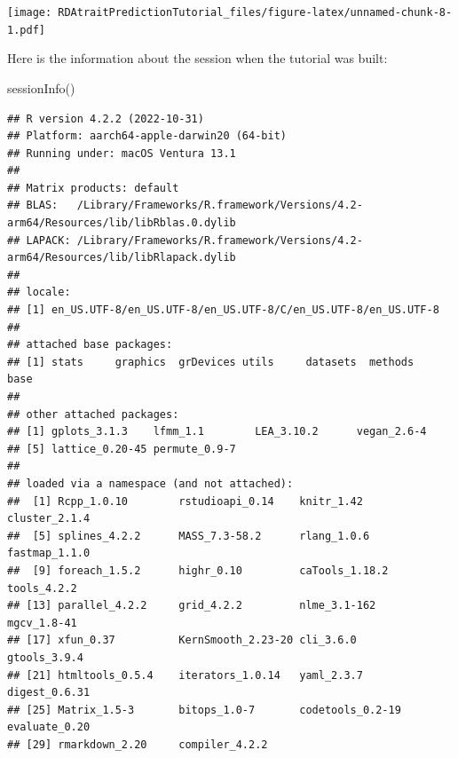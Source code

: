 \documentclass[
]{article}
\newenvironment{Shaded}{\begin{snugshade}}{\end{snugshade}}
\newcommand{\AttributeTok}[1]{\textcolor[rgb]{0.77,0.63,0.00}{#1}}
\newcommand{\ConstantTok}[1]{\textcolor[rgb]{0.00,0.00,0.00}{#1}}
\newcommand{\DecValTok}[1]{\textcolor[rgb]{0.00,0.00,0.81}{#1}}
\newcommand{\FunctionTok}[1]{\textcolor[rgb]{0.00,0.00,0.00}{#1}}
\newcommand{\NormalTok}[1]{#1}
\newcommand{\SpecialCharTok}[1]{\textcolor[rgb]{0.00,0.00,0.00}{#1}}
\newcommand{\StringTok}[1]{\textcolor[rgb]{0.31,0.60,0.02}{#1}}
\begin{document}
\begin{Shaded}
\end{Shaded}

\texttt{[image: RDAtraitPredictionTutorial\_files/figure-latex/unnamed-chunk-8-1.pdf]}

Here is the information about the session when the tutorial was built:

\begin{Shaded}
\begin{Highlighting}[]
\FunctionTok{sessionInfo}\NormalTok{()}
\end{Highlighting}
\end{Shaded}

\begin{verbatim}
## R version 4.2.2 (2022-10-31)
## Platform: aarch64-apple-darwin20 (64-bit)
## Running under: macOS Ventura 13.1
## 
## Matrix products: default
## BLAS:   /Library/Frameworks/R.framework/Versions/4.2-arm64/Resources/lib/libRblas.0.dylib
## LAPACK: /Library/Frameworks/R.framework/Versions/4.2-arm64/Resources/lib/libRlapack.dylib
## 
## locale:
## [1] en_US.UTF-8/en_US.UTF-8/en_US.UTF-8/C/en_US.UTF-8/en_US.UTF-8
## 
## attached base packages:
## [1] stats     graphics  grDevices utils     datasets  methods   base     
## 
## other attached packages:
## [1] gplots_3.1.3    lfmm_1.1        LEA_3.10.2      vegan_2.6-4    
## [5] lattice_0.20-45 permute_0.9-7  
## 
## loaded via a namespace (and not attached):
##  [1] Rcpp_1.0.10        rstudioapi_0.14    knitr_1.42         cluster_2.1.4     
##  [5] splines_4.2.2      MASS_7.3-58.2      rlang_1.0.6        fastmap_1.1.0     
##  [9] foreach_1.5.2      highr_0.10         caTools_1.18.2     tools_4.2.2       
## [13] parallel_4.2.2     grid_4.2.2         nlme_3.1-162       mgcv_1.8-41       
## [17] xfun_0.37          KernSmooth_2.23-20 cli_3.6.0          gtools_3.9.4      
## [21] htmltools_0.5.4    iterators_1.0.14   yaml_2.3.7         digest_0.6.31     
## [25] Matrix_1.5-3       bitops_1.0-7       codetools_0.2-19   evaluate_0.20     
## [29] rmarkdown_2.20     compiler_4.2.2
\end{verbatim}
\end{document}
